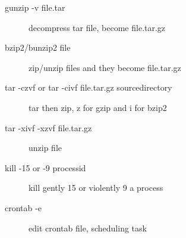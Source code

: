 \documentclass[12pt,a4paper]{report}
\begin{document}
\begin{description}
\item[gunzip -v file.tar] decompress tar file, become file.tar.gz  \\
\item[bzip2/bunzip2 file] zip/unzip files and they become file.tar.gz  \\
\item[tar -czvf or tar -civf file.tar.gz sourcedirectory] tar then zip, z for gzip and i for bzip2  \\
\item[tar -xivf -xzvf file.tar.gz] unzip file  \\
\item[kill -15 or -9 processid] kill gently 15 or violently 9 a process  \\
\item[crontab -e] edit crontab file, scheduling task
\end{description}

\vspace{20pt}
\end{document}
